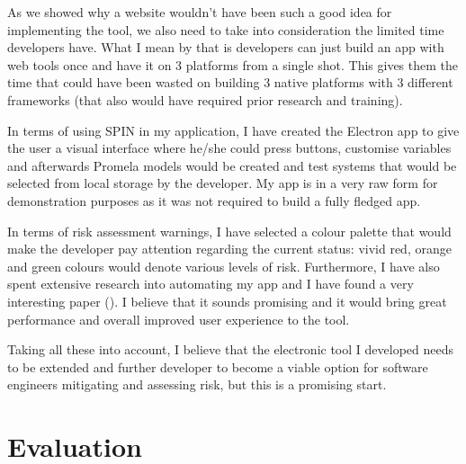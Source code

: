 \documentclass[paper=a4, fontsize=11pt]{scrartcl} %
\numberwithin{equation}{section} %
\numberwithin{figure}{section} %
\numberwithin{table}{section} %
\begin{document}
\par
As we showed why a website wouldn't have been such a good idea for implementing the tool, we also need to take into consideration the limited time developers have. What I mean by that is developers can just build an app with web tools once and have it on 3 platforms from a single shot. This gives them the time that could have been wasted on building 3 native platforms with 3 different frameworks (that also would have required prior research and training).\\

\par
In terms of using SPIN in my application, I have created the Electron app to give the user a visual interface where he/she could press buttons, customise variables and afterwards Promela models would be created and test systems that would be selected from local storage by the developer. My app is in a very raw form for demonstration purposes as it was not required to build a fully fledged app. \\

\par 
In terms of risk assessment warnings, I have selected a colour palette that would make the developer pay attention regarding the current status: vivid red, orange and green colours would denote various levels of risk. Furthermore, I have also spent extensive research into automating my app and I have found a very interesting paper (\citet{spin-uml}). I believe that it sounds promising and it would bring great performance and overall improved user experience to the tool. \\

\par 
Taking all these into account, I believe that the electronic tool I developed needs to be extended and further developer to become a viable option for software engineers mitigating and assessing risk, but this is a promising start. 




\section{Evaluation}
\end{document}
